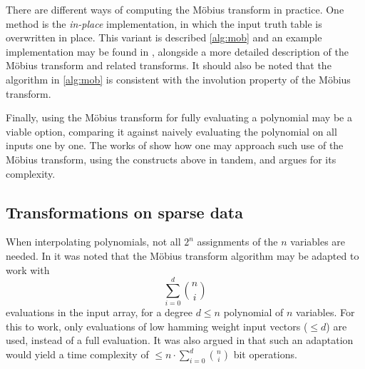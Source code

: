 There are different ways of computing the Möbius transform in practice. One method is the \textit{in-place} implementation, in which the input truth table is overwritten in place. This variant is described \cref{alg:mob} and an example implementation may be found in \cite{joux2009algorithmic}, alongside a more detailed description of the Möbius transform and related transforms. It should also be noted that the algorithm in \cref{alg:mob} is consistent with the involution property of the Möbius transform.

Finally, using the Möbius transform for fully evaluating a polynomial may be a viable option, comparing it against naively evaluating the polynomial on all inputs one by one. The works of \cite{fse-2011-23547} show how one may approach such use of the Möbius transform, using the constructs above in tandem, and argues for its complexity.

\subsection{Transformations on sparse data} \label{sec:prereq:poly_interp:sparse}
When interpolating polynomials, not all $2^n$ assignments of the $n$ variables are needed. In \cite{eurocrypt-2021-30841} it was noted that the Möbius transform algorithm may be adapted to work with 
$$
    \sum_{i = 0}^{d} \binom{n}{i}
$$
evaluations in the input array, for a degree $d \leq n$ polynomial of $n$ variables. For this to work, only evaluations of low hamming weight input vectors ($\leq d$) are used, instead of a full evaluation. It was also argued in \cite{eurocrypt-2021-30841} that such an adaptation would yield a time complexity of $\leq n \cdot \sum_{i = 0}^{d}\binom{n}{i}$ bit operations.